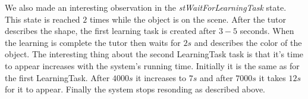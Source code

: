 \documentclass{article}
\begin{document}
We also made an interesting observation in the {\em stWaitForLearningTask}
state. This state is reached $2$ times while the object is on the scene. After
the tutor describes the shape, the first learning task is created after $3-5$
seconds. When the learning is complete the tutor then waits for $2s$ and
describes the color of the object.  The interesting thing about the second
LearningTask task is that it's time to appear increases with the system's
running time. Initially it is the same as for the first LearningTask. After
$4000s$ it increases to $7s$ and after $7000s$ it takes $12s$ for it to appear.
Finally the system stops resonding as described above.
\end{document}

